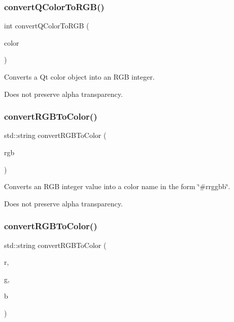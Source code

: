 \subsubsection{\texorpdfstring{convert\+Q\+Color\+To\+R\+G\+B()}{convertQColorToRGB()}}
{\footnotesize\ttfamily int convert\+Q\+Color\+To\+R\+GB (\begin{DoxyParamCaption}\item[{const Q\+Color \&}]{color }\end{DoxyParamCaption})\hspace{0.3cm}{\ttfamily [static]}}



Converts a Qt color object into an R\+GB integer. 

Does not preserve alpha transparency. \mbox{\label{classsgl_1_1GColor_a64353dd79967412aeebe46219e4a71df}} 
\subsubsection{\texorpdfstring{convert\+R\+G\+B\+To\+Color()}{convertRGBToColor()}\hspace{0.1cm}{\footnotesize\ttfamily [1/2]}}
{\footnotesize\ttfamily std\+::string convert\+R\+G\+B\+To\+Color (\begin{DoxyParamCaption}\item[{int}]{rgb }\end{DoxyParamCaption})\hspace{0.3cm}{\ttfamily [static]}}



Converts an R\+GB integer value into a color name in the form {\ttfamily \char`\"{}\#rrggbb\char`\"{}}. 

Does not preserve alpha transparency. \mbox{\label{classsgl_1_1GColor_a906729a293e62f8d112037016af21f9f}} 
\subsubsection{\texorpdfstring{convert\+R\+G\+B\+To\+Color()}{convertRGBToColor()}\hspace{0.1cm}{\footnotesize\ttfamily [2/2]}}
{\footnotesize\ttfamily std\+::string convert\+R\+G\+B\+To\+Color (\begin{DoxyParamCaption}\item[{int}]{r,  }\item[{int}]{g,  }\item[{int}]{b }\end{DoxyParamCaption})\hspace{0.3cm}{\ttfamily [static]}}



